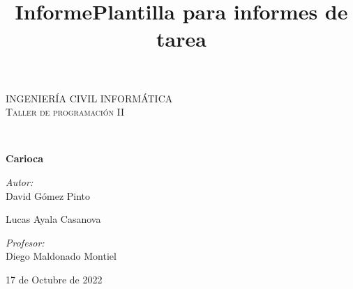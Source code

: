 \documentclass[60pt]{article}
\title{Informe}
\title{Plantilla para informes de tarea}
\newcommand{\depto}{Ingeniería Civil Informática}
\newcommand{\class}{Taller de programación II}
\newcommand{\Title}{Carioca}
\newcommand{\Author}{
David Gómez Pinto

Lucas Ayala Casanova}
\newcommand{\teacher}{Diego Maldonado Montiel}
\newcommand{\Date}{17 de Octubre de 2022}
\begin{document}
\thispagestyle{mytitlepagestyle}
\thispagestyle{mytitlepagestyle}
\noindent	                                                                        
\begin{center}                                                                      

    \vspace*{0.8cm}
    
    \begin{minipage}{0.9\textwidth}
        \begin{center}																	
            \textsc{\huge \uppercase{\depto}}\\[0.5cm]  						
            \textsc{\Large \class}\\[1.5cm] 								
        \end{center}
    \end{minipage}\\[0.5cm]																
    
    \vspace*{\fill}
    
    
    { \Huge \bfseries \Title}\\[0.4cm]										
    
    \vspace*{\fill}
    
    \begin{minipage}{0.46\textwidth}
        \begin{flushleft} \large
            \emph{Autor:}\\   																	
            \Author\\																	
            
        \end{flushleft}
    \end{minipage}
    
    \begin{minipage}{0.52\textwidth}
        \vspace{-0.6cm}
        \begin{flushright} \large
            \emph{Profesor:} \\                                                                 
            \teacher\\                                                   
        \end{flushright}
    \end{minipage}
    \vspace*{1cm}
    \vspace*{\fill}
    \begin{center}
        {\large \Date}
    \end{center}
\end{center}
\end{document}

